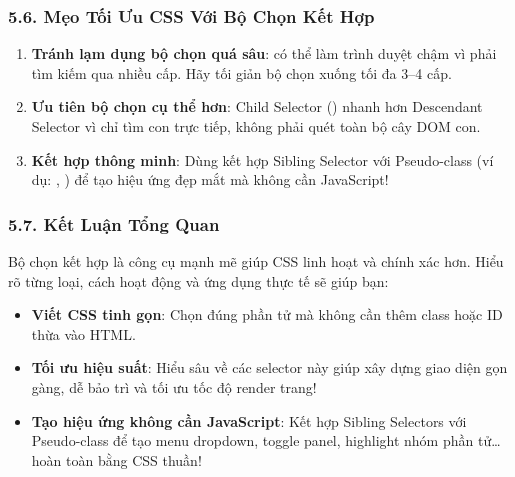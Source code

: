 \subsubsection{5.6. Mẹo Tối Ưu CSS Với Bộ Chọn Kết Hợp}

\begin{warnBox}
\begin{enumerate}[leftmargin=1.5em, itemsep=4pt, parsep=0pt]
    \item \textbf{Tránh lạm dụng bộ chọn quá sâu}:  có thể làm trình duyệt chậm vì phải tìm kiếm qua nhiều cấp. Hãy tối giản bộ chọn xuống tối đa 3--4 cấp.
    \item \textbf{Ưu tiên bộ chọn cụ thể hơn}: Child Selector (\codeinline{>}) nhanh hơn Descendant Selector vì chỉ tìm con trực tiếp, không phải quét toàn bộ cây DOM con.
    \item \textbf{Kết hợp thông minh}: Dùng kết hợp Sibling Selector với Pseudo-class (ví dụ: , ) để tạo hiệu ứng đẹp mắt mà không cần JavaScript!
\end{enumerate}
\end{warnBox}

\subsubsection{5.7. Kết Luận Tổng Quan}

\begin{tipBox}
Bộ chọn kết hợp là công cụ mạnh mẽ giúp CSS linh hoạt và chính xác hơn. Hiểu rõ từng loại, cách hoạt động và ứng dụng thực tế sẽ giúp bạn:
\begin{itemize}[leftmargin=1.5em, itemsep=3pt, parsep=0pt]
    \item \textbf{Viết CSS tinh gọn}: Chọn đúng phần tử mà không cần thêm class hoặc ID thừa vào HTML.
    \item \textbf{Tối ưu hiệu suất}: Hiểu sâu về các selector này giúp xây dựng giao diện gọn gàng, dễ bảo trì và tối ưu tốc độ render trang!
    \item \textbf{Tạo hiệu ứng không cần JavaScript}: Kết hợp Sibling Selectors với Pseudo-class để tạo menu dropdown, toggle panel, highlight nhóm phần tử\ldots{} hoàn toàn bằng CSS thuần!
\end{itemize}
\end{tipBox}



